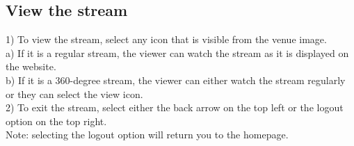 \documentclass[onecolumn, draftclsnofoot,10pt, compsoc]{IEEEtran}
\begin{document}
\subsection{View the stream}
1) To view the stream, select any icon that is visible from the venue image. \\
    \hspace*{1cm} a) If it is a regular stream, the viewer can watch the stream as it is displayed on the website. \\
    \hspace*{1cm} b) If it is a 360-degree stream, the viewer can either watch the stream regularly or they can select the view icon. \\
2) To exit the stream, select either the back arrow on the top left or the logout option on the top right. \\
\hspace*{1cm} Note: selecting the logout option will return you to the homepage.
\end{document}
